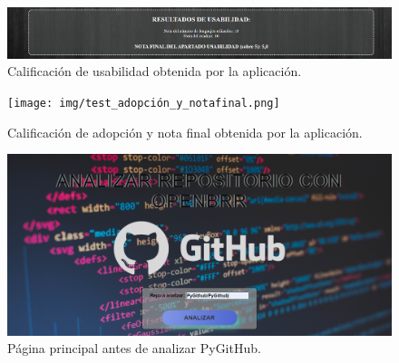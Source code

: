 \documentclass[a4paper, 12pt]{book}
\begin{document}
\begin{figure}
    \centering
    \includegraphics[width=1\textwidth, keepaspectratio]{img/test_usabilidad.png}
    \caption{Calificación de usabilidad obtenida por la aplicación.}\label{fig:test_usabilidad}
\end{figure}
\begin{figure}
    \centering
    \texttt{[image: img/test\_adopción\_y\_notafinal.png]}
    \caption{Calificación de adopción y nota final obtenida por la aplicación.}\label{fig:test_adopción_y_notafinal}
\end{figure}

\begin{figure}
    \centering
    \includegraphics[width=1\textwidth, keepaspectratio]{img/principal_main.png}
    \caption{Página principal antes de analizar PyGitHub.}\label{fig:pricipal_pygithub}
\end{figure}
\end{document}
